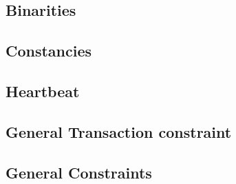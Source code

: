\subsection{Binarities}                           
\subsection{Constancies}                          
\subsection{Heartbeat}                            
\subsection{General Transaction constraint}       
\subsection{General Constraints}                  
